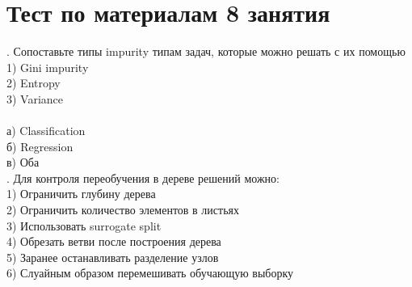 \documentclass[10pt,a4paper]{article}
\begin{document}
\section*{Тест по материалам 8 занятия}

. Сопоставьте типы impurity типам задач, которые можно решать с их помощью \\
1) Gini impurity \\
2) Entropy \\ 
3) Variance \\
\\
а) Classification \\
б) Regression \\
в) Оба \\

. Для контроля переобучения в дереве решений можно: \\
1) Ограничить глубину дерева \\
2) Ограничить количество элементов в листьях \\
3) Использовать surrogate split \\
4) Обрезать ветви после построения дерева \\
5) Заранее останавливать разделение узлов \\
6) Слуайным образом перемешивать обучающую выборку
\end{document}
